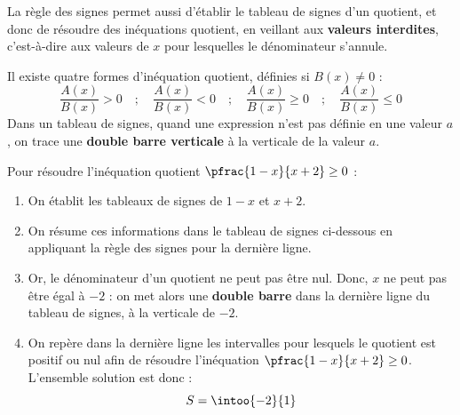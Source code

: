 La règle des signes permet aussi d'établir le tableau de signes d'un quotient, et donc de résoudre des inéquations quotient, en veillant aux \textbf{valeurs interdites}, c'est-à-dire aux valeurs de $x$ pour lesquelles le dénominateur s'annule.

\begin{remarque}
	Il existe quatre formes d'inéquation quotient, définies si $B(x) \neq 0$ :
	\[
		\frac{A(x)}{B(x)} > 0 \quad ; \quad \frac{A(x)}{B(x)} < 0 \quad ; \quad \frac{A(x)}{B(x)} \ge 0 \quad ; \quad \frac{A(x)}{B(x)} \le 0
	\]
	Dans un tableau de signes, quand une expression n'est pas définie en une valeur $a$, on trace une \textbf{double barre verticale} à la verticale de la valeur $a$.
\end{remarque}

\begin{exemple}
	Pour résoudre l'inéquation quotient $\pfrac{1-x}{x+2} \ge 0$ :
	\begin{enumerate}
		\item On établit les tableaux de signes de $1-x$ et $x+2$.
		\item On résume ces informations dans le tableau de signes ci-dessous en appliquant la règle des signes pour la dernière ligne.
		\item Or, le dénominateur d'un quotient ne peut pas être nul. Donc, $x$ ne peut pas être égal à $-2$ : on met alors une \textbf{double barre} dans la dernière ligne du tableau de signes, à la verticale de $-2$.

		      \begin{center}
		      \end{center}

		\item On repère dans la dernière ligne les intervalles pour lesquels le quotient est positif ou nul afin de résoudre l'inéquation $\pfrac{1-x}{x+2} \ge 0$. L'ensemble solution est donc :
		      \[
			      S = \intoo{-2}{1}
		      \]
	\end{enumerate}
\end{exemple}
